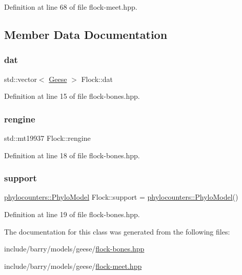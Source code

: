 Definition at line 68 of file flock-\/meet.\+hpp.



\subsection{Member Data Documentation}
\mbox{\label{class_flock_af493163235db2dcb44b8c5e615f52bdb}} 
\subsubsection{\texorpdfstring{dat}{dat}}
{\footnotesize\ttfamily std\+::vector$<$ \hyperlink{class_geese}{Geese} $>$ Flock\+::dat}



Definition at line 15 of file flock-\/bones.\+hpp.

\mbox{\label{class_flock_a0e3ce6d007f667eea9f036cddb6789b6}} 
\subsubsection{\texorpdfstring{rengine}{rengine}}
{\footnotesize\ttfamily std\+::mt19937 Flock\+::rengine}



Definition at line 18 of file flock-\/bones.\+hpp.

\mbox{\label{class_flock_a20d75da0d423252055af84194e88f901}} 
\subsubsection{\texorpdfstring{support}{support}}
{\footnotesize\ttfamily \hyperlink{namespacebarry_1_1counters_1_1phylo_ad32b4186e3bab93119df225fddc3c609}{phylocounters\+::\+Phylo\+Model} Flock\+::support = \hyperlink{namespacebarry_1_1counters_1_1phylo_ad32b4186e3bab93119df225fddc3c609}{phylocounters\+::\+Phylo\+Model}()}



Definition at line 19 of file flock-\/bones.\+hpp.



The documentation for this class was generated from the following files\+:\begin{DoxyCompactItemize}
\item 
include/barry/models/geese/\hyperlink{flock-bones_8hpp}{flock-\/bones.\+hpp}\item 
include/barry/models/geese/\hyperlink{flock-meet_8hpp}{flock-\/meet.\+hpp}\end{DoxyCompactItemize}
